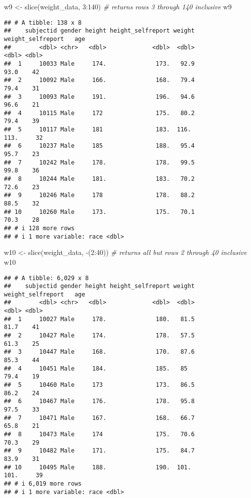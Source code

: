 \documentclass[
]{article}
\newenvironment{Shaded}{\begin{snugshade}}{\end{snugshade}}
\newcommand{\CommentTok}[1]{\textcolor[rgb]{0.56,0.35,0.01}{\textit{#1}}}
\newcommand{\DecValTok}[1]{\textcolor[rgb]{0.00,0.00,0.81}{#1}}
\newcommand{\FunctionTok}[1]{\textcolor[rgb]{0.00,0.00,0.00}{#1}}
\newcommand{\NormalTok}[1]{#1}
\newcommand{\OtherTok}[1]{\textcolor[rgb]{0.56,0.35,0.01}{#1}}
\newcommand{\SpecialCharTok}[1]{\textcolor[rgb]{0.00,0.00,0.00}{#1}}
\begin{document}
\begin{Shaded}
\begin{Highlighting}[]
\NormalTok{w9 }\OtherTok{\textless{}{-}} \FunctionTok{slice}\NormalTok{(weight\_data, }\DecValTok{3}\SpecialCharTok{:}\DecValTok{140}\NormalTok{) }\CommentTok{\# returns rows 3 through 140 inclusive}
\NormalTok{w9}
\end{Highlighting}
\end{Shaded}

\begin{verbatim}
## # A tibble: 138 x 8
##    subjectid gender height height_selfreport weight weight_selfreport   age
##        <dbl> <chr>   <dbl>             <dbl>  <dbl>             <dbl> <dbl>
##  1     10033 Male     174.              173.   92.9              93.0    42
##  2     10092 Male     166.              168.   79.4              79.4    31
##  3     10093 Male     191.              196.   94.6              96.6    21
##  4     10115 Male     172               175.   80.2              79.4    39
##  5     10117 Male     181               183.  116.              113.     32
##  6     10237 Male     185               188.   95.4              95.7    23
##  7     10242 Male     178.              178.   99.5              99.8    36
##  8     10244 Male     181.              183.   70.2              72.6    23
##  9     10246 Male     178               178.   88.2              88.5    32
## 10     10260 Male     173.              175.   70.1              70.3    28
## # i 128 more rows
## # i 1 more variable: race <dbl>
\end{verbatim}

\begin{Shaded}
\begin{Highlighting}[]
\NormalTok{w10 }\OtherTok{\textless{}{-}} \FunctionTok{slice}\NormalTok{(weight\_data, }\SpecialCharTok{{-}}\NormalTok{(}\DecValTok{2}\SpecialCharTok{:}\DecValTok{40}\NormalTok{)) }\CommentTok{\# returns all but rows 2 through 40 inclusive}
\NormalTok{w10}
\end{Highlighting}
\end{Shaded}

\begin{verbatim}
## # A tibble: 6,029 x 8
##    subjectid gender height height_selfreport weight weight_selfreport   age
##        <dbl> <chr>   <dbl>             <dbl>  <dbl>             <dbl> <dbl>
##  1     10027 Male     178.              180.   81.5              81.7    41
##  2     10427 Male     174.              178.   57.5              61.3    25
##  3     10447 Male     168.              170.   87.6              85.3    44
##  4     10451 Male     184.              185.   85                79.4    19
##  5     10460 Male     173               173.   86.5              86.2    24
##  6     10467 Male     176.              178.   95.8              97.5    33
##  7     10471 Male     167.              168.   66.7              65.8    21
##  8     10473 Male     174               175.   70.6              70.3    29
##  9     10482 Male     171.              175.   84.7              83.9    31
## 10     10495 Male     188.              190.  101.              101.     39
## # i 6,019 more rows
## # i 1 more variable: race <dbl>
\end{verbatim}
\end{document}
